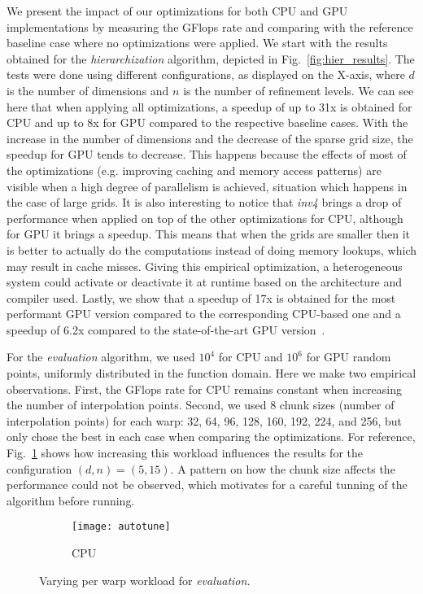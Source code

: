 We present the impact of our optimizations for both CPU and GPU implementations
by measuring the GFlops rate and comparing with the reference baseline case
where no optimizations were applied. We start with the results obtained for the
\textit{hierarchization} algorithm, depicted in Fig.~\ref{fig:hier_results}. The
tests were done using different configurations, as displayed on the X-axis,
where $d$ is the number of dimensions and $n$ is the number of refinement
levels. We can see here that when applying all optimizations, a speedup of up to
31x is obtained for CPU and up to 8x for GPU compared to the respective baseline
cases. With the increase in the number of dimensions and the decrease of the
sparse grid size, the speedup for GPU tends to decrease. This happens because
the effects of most of the optimizations (e.g. improving caching and memory
access patterns) are visible when a high degree of parallelism is achieved,
situation which happens in the case of large grids. It is also interesting to
notice that \textit{inv4} brings a drop of performance when applied on top of
the other optimizations for CPU, although for GPU it brings a speedup. This
means that when the grids are smaller then it is better to actually do the
computations instead of doing memory lookups, which may result in cache misses.
Giving this empirical optimization, a heterogeneous system could activate or
deactivate it at runtime based on the architecture and compiler used. Lastly, we
show that a speedup of 17x is obtained for the most performant GPU version
compared to the corresponding CPU-based one and a speedup of 6.2x compared to
the state-of-the-art GPU version~\cite{Murarasu:2011:CDS:1941553.1941559}.

For the \textit{evaluation} algorithm, we used $10^{4}$ for CPU and $10^{6}$
for GPU random points, uniformly distributed in the function domain. Here we
make two empirical observations. First, the GFlops rate for CPU remains constant
when increasing the number of interpolation points. Second, we used 8 chunk
sizes (number of interpolation points) for each warp: 32, 64, 96, 128, 160, 192,
224, and 256, but only chose the best in each case when comparing the
optimizations. For reference, Fig.~\ref{fig:autotune} shows how increasing this
workload influences the results for the configuration $(d, n) = (5, 15)$. A
pattern on how the chunk size affects the performance could not be observed,
which motivates for a careful tunning of the algorithm before running.

\begin{figure}[t]
  \begin{subfigure}[b]{1\linewidth}
    \centering
    \texttt{[image: autotune]} \\
    \caption{CPU}
  \end{subfigure}
  \caption{Varying per warp workload for \textit{evaluation}.}
  \label{fig:autotune}
\end{figure}


